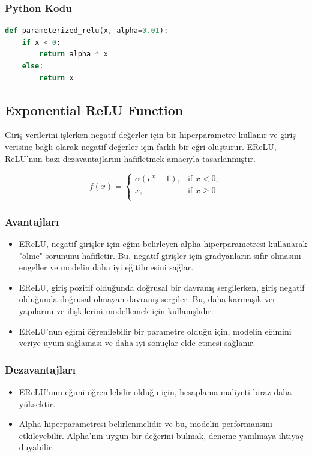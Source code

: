 \subsubsection{Python Kodu}

\begin{lstlisting}[language=Python]
def parameterized_relu(x, alpha=0.01):
    if x < 0:
        return alpha * x
    else:
        return x
\end{lstlisting}

\newpage

\subsection{Exponential ReLU Function}
Giriş verilerini işlerken negatif değerler için bir hiperparametre kullanır ve giriş verisine bağlı olarak negatif değerler için farklı bir eğri oluşturur. EReLU, ReLU'nun bazı dezavantajlarını hafifletmek amacıyla tasarlanmıştır.

\[f(x) = \begin{cases} 
\alpha(e^x - 1), & \text{if } x < 0, \\
x, & \text{if } x \geq 0. \\
\end{cases}\]

\subsubsection{Avantajları}
\begin{itemize}
    \item EReLU, negatif girişler için eğim belirleyen alpha hiperparametresi kullanarak "ölme" sorununu hafifletir. Bu, negatif girişler için gradyanların sıfır olmasını engeller ve modelin daha iyi eğitilmesini sağlar.
    \item EReLU, giriş pozitif olduğunda doğrusal bir davranış sergilerken, giriş negatif olduğunda doğrusal olmayan davranış sergiler. Bu, daha karmaşık veri yapılarını ve ilişkilerini modellemek için kullanışlıdır.
    \item EReLU'nun eğimi öğrenilebilir bir parametre olduğu için, modelin eğimini veriye uyum sağlaması ve daha iyi sonuçlar elde etmesi sağlanır.
\end{itemize}

\subsubsection{Dezavantajları}
\begin{itemize}
    \item EReLU'nun eğimi öğrenilebilir olduğu için, hesaplama maliyeti biraz daha yüksektir.
    \item Alpha hiperparametresi belirlenmelidir ve bu, modelin performansını etkileyebilir. Alpha'nın uygun bir değerini bulmak, deneme yanılmaya ihtiyaç duyabilir.
\end{itemize}

